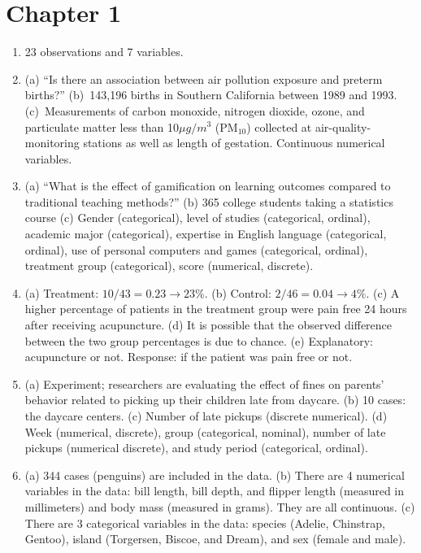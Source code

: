 \documentclass[
  10pt,
  openany]{book}
\providecommand{\tightlist}{%
  \setlength{\itemsep}{0pt}\setlength{\parskip}{0pt}}
\begin{document}
\hypertarget{exercise-solutions-01}{%
\section{Chapter 1}\label{exercise-solutions-01}}

\begin{enumerate}
\def\labelenumi{\arabic{enumi}.}
\tightlist
\item
  23 observations and 7 variables.

  \addtocounter{enumi}{1}
\item
  (a) ``Is there an association between air pollution exposure and preterm births?'' (b)~143,196 births in Southern California between 1989 and 1993. (c)~Measurements of carbon monoxide, nitrogen dioxide, ozone, and particulate matter less than 10\(\mu g/m^3\) (PM\(_{10}\)) collected at air-quality-monitoring stations as well as length of gestation. Continuous numerical variables.

  \addtocounter{enumi}{1}
\item
  (a) ``What is the effect of gamification on learning outcomes compared to traditional teaching methods?'' (b) 365 college students taking a statistics course (c) Gender (categorical), level of studies (categorical, ordinal), academic major (categorical), expertise in English language (categorical, ordinal), use of personal computers and games (categorical, ordinal), treatment group (categorical), score (numerical, discrete).

  \addtocounter{enumi}{1}
\item
  (a) Treatment: \(10/43 = 0.23 \rightarrow 23\%\). (b) Control: \(2/46 = 0.04 \rightarrow 4\%\). (c) A higher percentage of patients in the treatment group were pain free 24 hours after receiving acupuncture. (d) It is possible that the observed difference between the two group percentages is due to chance. (e) Explanatory: acupuncture or not. Response: if the patient was pain free or not.

  \addtocounter{enumi}{1}
\item
  (a) Experiment; researchers are evaluating the effect of fines on parents' behavior related to picking up their children late from daycare. (b) 10 cases: the daycare centers. (c) Number of late pickups (discrete numerical). (d) Week (numerical, discrete), group (categorical, nominal), number of late pickups (numerical discrete), and study period (categorical, ordinal).

  \addtocounter{enumi}{1}
\item
  (a) 344 cases (penguins) are included in the data. (b) There are 4 numerical variables in the data: bill length, bill depth, and flipper length (measured in millimeters) and body mass (measured in grams). They are all continuous. (c) There are 3 categorical variables in the data: species (Adelie, Chinstrap, Gentoo), island (Torgersen, Biscoe, and Dream), and sex (female and male).


\end{enumerate}
\end{document}
